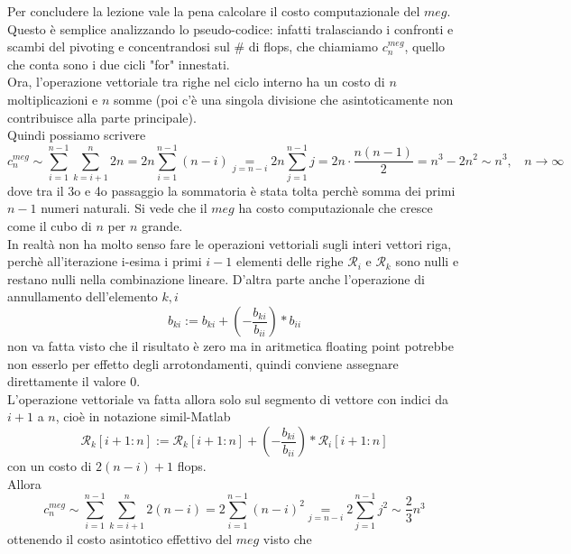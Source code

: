 \documentclass[12pt,a4paper]{article}
\begin{document}
Per concludere la lezione vale la pena calcolare il costo computazionale del $meg$.\\Questo è semplice analizzando lo pseudo-codice: infatti tralasciando i confronti e scambi del pivoting e concentrandosi sul \# di flops, che chiamiamo $c_n^{meg}$, quello che conta sono i due cicli "for" innestati.\\Ora, l'operazione vettoriale tra righe nel ciclo interno ha un costo di $n$ moltiplicazioni e $n$ somme (poi c'è una singola divisione che asintoticamente non contribuisce alla parte principale).\\Quindi possiamo scrivere
\begin{equation*}
    c_n^{meg}\sim\sum_{i=1}^{n-1}\sum_{k=i+1}^{n}2n=2n\sum_{i=1}^{n-1}(n-i)\underset{j=n-i}{=}2n\sum_{j=1}^{n-1}j=2n\cdot\frac{n(n-1)}{2}=n^3-2n^2\sim n^3,\  \  \  \  n\rightarrow\infty
\end{equation*}
dove tra il 3o e 4o passaggio la sommatoria è stata tolta perchè somma dei primi $n-1$ numeri naturali. Si vede che il $meg$ ha costo computazionale che cresce come il cubo di $n$ per $n$ grande.\\In realtà non ha molto senso fare le operazioni vettoriali sugli interi vettori riga, perchè all'iterazione i-esima i primi $i-1$ elementi delle righe $\mathcal{R}_i$ e $\mathcal{R}_k$ sono nulli e restano nulli nella combinazione lineare. D'altra parte anche l'operazione di annullamento dell'elemento $k,i$
\begin{equation*}
    b_{ki}:=b_{ki}+(-\frac{b_{ki}}{b_{ii}})\ast b_{ii}
\end{equation*}
non va fatta visto che il risultato è zero ma in aritmetica floating point potrebbe non esserlo per effetto degli arrotondamenti, quindi conviene assegnare direttamente il valore 0.\\L'operazione vettoriale va fatta allora solo sul segmento di vettore con indici da $i+1$ a $n$, cioè in notazione simil-Matlab
\begin{equation*}
    \mathcal{R}_k[i+1:n]:=\mathcal{R}_k[i+1:n]+(-\frac{b_{ki}}{b_{ii}})\ast \mathcal{R}_i[i+1:n]
\end{equation*}
con un costo di $2(n-i)+1$ flops.\\Allora
\begin{equation*}
    c_n^{meg}\sim\sum_{i=1}^{n-1}\sum_{k=i+1}^{n}2(n-i)=2\sum_{i=1}^{n-1}(n-i)^2\underset{j=n-i}{=}2\sum_{j=1}^{n-1}j^2\sim \frac{2}{3}n^3
\end{equation*}
ottenendo il costo asintotico effettivo del $meg$ visto che
\end{document}
